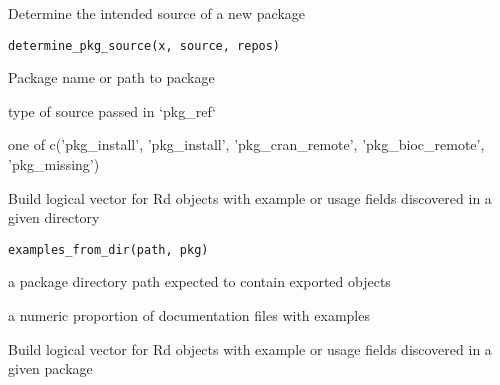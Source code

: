 \documentclass[a4paper]{book}
\begin{document}
%
\begin{Description}
Determine the intended source of a new package
\end{Description}
%
\begin{Usage}
\begin{verbatim}
determine_pkg_source(x, source, repos)
\end{verbatim}
\end{Usage}
%
\begin{Arguments}
\begin{ldescription}
\item[\code{x}] Package name or path to package

\item[\code{source}] type of source passed in `pkg\_ref`
\end{ldescription}
\end{Arguments}
%
\begin{Value}
one of c('pkg\_install', 'pkg\_install', 'pkg\_cran\_remote',
'pkg\_bioc\_remote', 'pkg\_missing')
\end{Value}
%
\begin{Description}
Build logical vector for Rd objects with example or usage fields discovered in a given directory
\end{Description}
%
\begin{Usage}
\begin{verbatim}
examples_from_dir(path, pkg)
\end{verbatim}
\end{Usage}
%
\begin{Arguments}
\begin{ldescription}
\item[\code{path}] a package directory path expected to contain exported objects
\end{ldescription}
\end{Arguments}
%
\begin{Value}
a numeric proportion of documentation files with examples
\end{Value}
%
\begin{Description}
Build logical vector for Rd objects with example or usage fields discovered in a given package
\end{Description}
\end{document}
